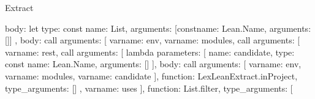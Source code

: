 \begin{lexlean}{Extract}
\begin{toolingmodule}
{{{{{{{{{{{{{{{{                                            body: let{
                                              type: const{
                                                name: List,
                                                arguments: [const{name: Lean.Name, arguments: []}]
                                              },
                                              body: call{
                                                arguments: [
                                                  var{name: env},
                                                  var{name: modules},
                                                  call{
                                                    arguments: [
                                                      var{name: rest},
                                                      call{
                                                        arguments: [
                                                          lambda{
                                                            parameters: [
                                                              {
                                                                name: candidate,
                                                                type: const{
                                                                  name: Lean.Name,
                                                                  arguments: []
                                                                }
                                                              }
                                                            ],
                                                            body: call{
                                                              arguments: [
                                                                var{name: env},
                                                                var{name: modules},
                                                                var{name: candidate}
                                                              ],
                                                              function: LexLeanExtract.inProject,
                                                              type_arguments: []
                                                            }
                                                          },
                                                          var{name: uses}
                                                        ],
                                                        function: List.filter,
                                                        type_arguments: [
}}}}}}}}}}}}}}}}}}}}
\end{toolingmodule}
\end{lexlean}
